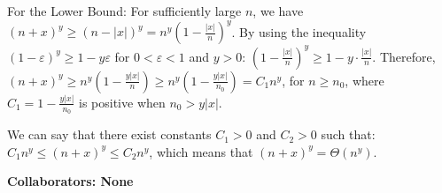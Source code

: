 \documentclass[12 pt]{article}
\begin{document}
For the Lower Bound: For sufficiently large $n$, we have $(n + x)^y \geq (n - |x|)^y = n^y \left(1 - \frac{|x|}{n}\right)^y$. By using the inequality $(1 - \varepsilon)^y \geq 1 - y\varepsilon$ for $0 < \varepsilon < 1$ and $y > 0$: $\left(1 - \frac{|x|}{n}\right)^y \geq 1 - y \cdot \frac{|x|}{n}$. Therefore, $(n + x)^y \geq n^y \left(1 - \frac{y|x|}{n}\right) \geq n^y \left(1 - \frac{y|x|}{n_0}\right) = C_1 n^y$, for $n \geq n_0$, where $C_1 = 1 - \frac{y|x|}{n_0}$ is positive when $n_0 > y|x|$.

We can say that there exist constants $C_1 > 0$ and $C_2 > 0$ such that: $C_1 n^y \leq (n + x)^y \leq C_2 n^y$, which means that
$(n + x)^y = \Theta(n^y)$.


\vspace{1cm}



\noindent\textbf{Collaborators: None}
\end{document}
